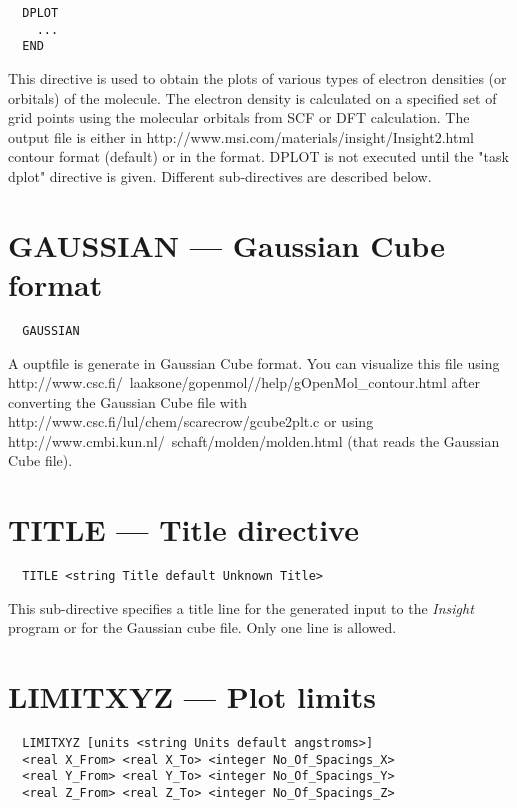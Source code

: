 \label{sec:dplot}
\begin{verbatim}
  DPLOT
    ...
  END
\end{verbatim}

This directive is used to obtain the plots of various types of electron
densities (or orbitals) of the molecule. The electron density is calculated
on a specified set of grid points using the molecular orbitals
from SCF or DFT calculation. The output file is either in 
{http://www.msi.com/materials/insight/Insight2.html} contour format
(default)
 or in the 
format.  DPLOT is not executed until the "task dplot" directive is given.  
Different sub-directives are described below.

\section{GAUSSIAN --- Gaussian Cube format}

\begin{verbatim}
  GAUSSIAN
\end{verbatim}

A ouptfile is generate in Gaussian Cube format.
You can visualize this file using  
{http://www.csc.fi/~laaksone/gopenmol//help/gOpenMol_contour.html}
after converting the Gaussian Cube file with 
{http://www.csc.fi/lul/chem/scarecrow/gcube2plt.c}
or using 
{http://www.cmbi.kun.nl/~schaft/molden/molden.html} (that reads
the Gaussian Cube file).

\section{TITLE --- Title directive}

\begin{verbatim}
  TITLE <string Title default Unknown Title>
\end{verbatim}

This sub-directive specifies a title line for the generated
input to the {\em Insight} program or for the Gaussian cube
file. Only one line is allowed.

\section{LIMITXYZ --- Plot limits}

\begin{verbatim}
  LIMITXYZ [units <string Units default angstroms>]
  <real X_From> <real X_To> <integer No_Of_Spacings_X>
  <real Y_From> <real Y_To> <integer No_Of_Spacings_Y>
  <real Z_From> <real Z_To> <integer No_Of_Spacings_Z>
\end{verbatim}

